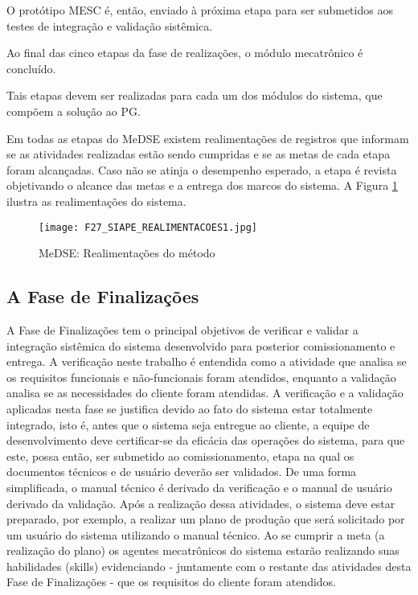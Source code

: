 \begin{description}
\begin{enumerate}
  	O protótipo MESC é, então,  enviado à próxima etapa para ser submetidos aos testes de integração e validação sistêmica. 
  	
  \end{enumerate}
  
  Ao final das cinco etapas da fase de realizações, o módulo mecatrônico é concluído.
  
  Tais etapas devem ser realizadas para cada um dos módulos do sistema, que compõem a solução ao PG.
  
  Em todas as etapas do MeDSE existem realimentações de registros que informam se as atividades realizadas estão sendo cumpridas e se as metas de cada etapa foram alcançadas.  Caso não se atinja o desempenho esperado, a etapa é revista objetivando o alcance das metas e a entrega dos marcos do sistema. A Figura \ref{F29} ilustra as realimentações do sistema.
  
  \begin{figure}[h!]
  	\centering
  	\texttt{[image: F27\_SIAPE\_REALIMENTACOES1.jpg]} 
  	\caption{MeDSE: Realimentações do método}
  	\label{F29}
  \end{figure}
   
\end{description}
 
 
\subsection{A Fase de Finalizações}
 
A Fase de Finalizações tem o principal objetivos de verificar e validar a integração sistêmica do sistema desenvolvido para posterior comissionamento e entrega. A verificação neste trabalho é entendida como a atividade que analisa se os requisitos funcionais e não-funcionais foram atendidos, enquanto a validação analisa se as necessidades do cliente foram atendidas. A verificação e a validação aplicadas nesta fase se justifica devido ao fato do sistema estar totalmente integrado, isto é, antes que o sistema seja entregue ao cliente, a equipe de desenvolvimento deve certificar-se da eficácia das operações do sistema, para  que este, possa então, ser submetido ao comissionamento, etapa na qual os documentos técnicos e de usuário deverão ser validados. De uma forma simplificada, o manual técnico é derivado da verificação e o manual de usuário derivado da validação. Após a realização dessa atividades, o sistema deve estar preparado, por exemplo, a realizar um plano de produção que será solicitado por um usuário do sistema utilizando o manual técnico. Ao se cumprir a meta (a realização do plano)  os agentes mecatrônicos do sistema estarão realizando suas habilidades (skills) evidenciando - juntamente com o restante das atividades desta Fase de Finalizações - que os requisitos do cliente foram atendidos.
  

